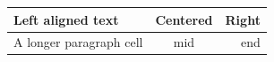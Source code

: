 \documentclass{article}
\begin{document}
\begin{tabulary}{\linewidth}{|L|C|R|}
\hline
Left aligned text & Centered & Right \\
\hline
A longer paragraph cell & mid & end \\
\hline
\end{tabulary}
\end{document}
